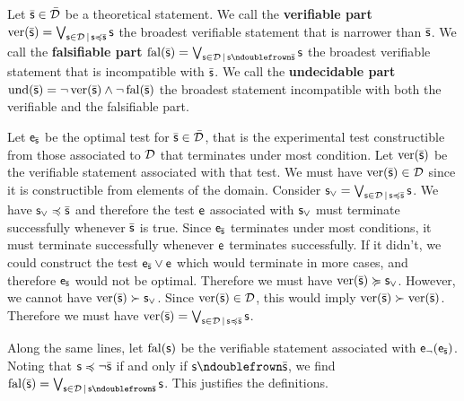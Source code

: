 	\begin{mathSection}
		\begin{defn}
			Let $\bar{\mathsf{s}} \in \bar{\mathcal{D}}$ be a theoretical statement. We call the \textbf{verifiable part} $\operatorname{ver}(\bar{\mathsf{s}}) = \bigvee_{\mathsf{s} \in \mathcal{D} \, | \, \mathsf{s} \preccurlyeq \bar{\mathsf{s}}} \mathsf{s}$ the broadest verifiable statement that is narrower than $\bar{\mathsf{s}}$. We call the \textbf{falsifiable part} $\fal(\bar{\stmt}) = \bigOR_{\stmt \in \edomain \, | \, \stmt \ncomp \bar{\stmt}} \stmt$ the broadest verifiable statement that is incompatible with $\bar{\mathsf{s}}$. We call the \textbf{undecidable part} $\operatorname{und}(\bar{\mathsf{s}}) = \neg \operatorname{ver}(\bar{\mathsf{s}}) \wedge \neg \operatorname{fal}(\bar{\mathsf{s}})$ the broadest statement incompatible with both the verifiable and the falsifiable part.
		\end{defn}
		\begin{justification}
			Let $\mathsf{e}_{\bar{\mathsf{s}}}$ be the optimal test for $\bar{\mathsf{s}} \in \bar{\mathcal{D}}$, that is the experimental test constructible from those associated to $\mathcal{D}$ that terminates under most condition. Let $\operatorname{ver}(\bar{\mathsf{s}})$ be the verifiable statement associated with that test. We must have $\operatorname{ver}(\bar{\mathsf{s}}) \in \mathcal{D}$ since it is constructible from elements of the domain. Consider $\mathsf{s}_{\vee} = \bigvee_{\mathsf{s} \in \mathcal{D} \, | \, \mathsf{s} \preccurlyeq \bar{\mathsf{s}}} \mathsf{s}$. We have $\mathsf{s}_{\vee} \preccurlyeq \bar{\mathsf{s}}$ and therefore the test $\mathsf{e}$ associated with $\mathsf{s}_{\vee}$ must terminate successfully whenever $\bar{\mathsf{s}}$ is true. Since $\mathsf{e}_{\bar{\mathsf{s}}}$ terminates under most conditions, it must terminate successfully whenever $\mathsf{e}$ terminates successfully. If it didn't, we could construct the test $\mathsf{e}_{\bar{\mathsf{s}}} \vee \mathsf{e}$ which would terminate in more cases, and therefore $\mathsf{e}_{\bar{\mathsf{s}}}$ would not be optimal. Therefore we must have $\operatorname{ver}(\bar{\mathsf{s}}) \succcurlyeq \mathsf{s}_{\vee}$.  However, we cannot have $\operatorname{ver}(\bar{\mathsf{s}}) \succ \mathsf{s}_{\vee}$. Since $\operatorname{ver}(\bar{\mathsf{s}}) \in \mathcal{D}$, this would imply $\operatorname{ver}(\bar{\mathsf{s}}) \succ \operatorname{ver}(\bar{\mathsf{s}})$. Therefore we must have $\operatorname{ver}(\bar{\mathsf{s}}) = \bigvee_{\mathsf{s} \in \mathcal{D} \, | \, \mathsf{s} \preccurlyeq \bar{\mathsf{s}}} \mathsf{s}$.
			
			Along the same lines, let $\operatorname{fal}(\mathsf{s})$ be the verifiable statement associated with $\mathsf{e}_\neg(\mathsf{e}_{\bar{\mathsf{s}}})$. Noting that $\mathsf{s} \preccurlyeq \neg \bar{\mathsf{s}}$ if and only if $\stmt \ncomp \tstmt$, we find $\fal(\bar{\stmt}) = \bigOR_{\stmt \in \edomain \, | \, \stmt \ncomp \tstmt} \stmt$. This justifies the definitions.
		\end{justification}
		

\end{mathSection}
